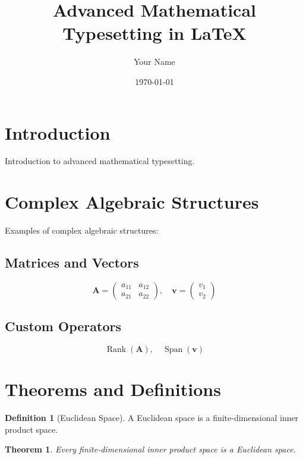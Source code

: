 \documentclass[11pt]{article}
\title{Advanced Mathematical Typesetting in LaTeX}
\author{Your Name}
\date{\today}
\theoremstyle{definition}
\newtheorem{definition}{Definition}[section]
\theoremstyle{remark}
\theoremstyle{plain}
\newtheorem{theorem}{Theorem}[section]
\DeclareMathOperator{\Rank}{Rank}
\DeclareMathOperator{\Span}{Span}
\begin{document}
\maketitle

\section{Introduction}
Introduction to advanced mathematical typesetting.

\section{Complex Algebraic Structures}
Examples of complex algebraic structures:

\subsection{Matrices and Vectors}
\begin{equation}
    \mathbf{A} = 
    \begin{pmatrix}
        a_{11} & a_{12} \\
        a_{21} & a_{22}
    \end{pmatrix}, \quad
    \mathbf{v} = 
    \begin{pmatrix}
        v_1 \\
        v_2
    \end{pmatrix}
\end{equation}

\subsection{Custom Operators}
\begin{equation}
    \Rank(\mathbf{A}), \quad \Span(\mathbf{v})
\end{equation}

\section{Theorems and Definitions}
\begin{definition}[Euclidean Space]
    A Euclidean space is a finite-dimensional inner product space.
\end{definition}

\begin{theorem}
    Every finite-dimensional inner product space is a Euclidean space.
\end{theorem}
\end{document}
